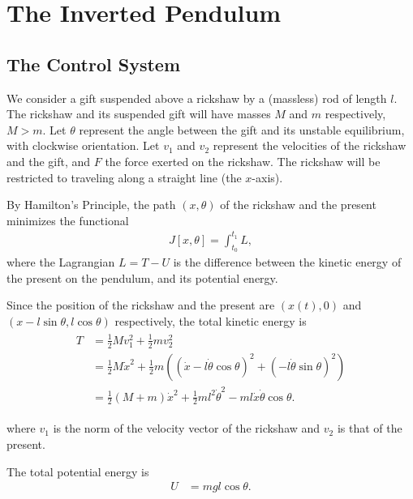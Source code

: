\section*{The Inverted Pendulum}
\subsection*{The Control System}
We consider a gift suspended above a rickshaw by a (massless) rod of length $l$.
The rickshaw and its suspended gift will have masses $M$ and $m$ respectively, $M > m$.
Let $\theta $ represent the angle between the gift and its unstable equilibrium, with clockwise orientation.
Let $v_1$ and $v_2$ represent the velocities of the rickshaw and the gift, and $F$ the force exerted on the rickshaw.
The rickshaw will be restricted to traveling along a straight line (the $x$-axis).

By Hamilton's Principle, the path $(x,\theta)$ of the rickshaw and the present minimizes the functional
\begin{align}
J[x,\theta] = \int_{t_0}^{t_1}	L,
\end{align}
where the Lagrangian $L = T - U$ is the difference between the kinetic energy of the present on the pendulum, and its potential energy.

Since the position of the rickshaw and the present are $(x(t),0)$ and $(x-l\sin \theta, l\cos \theta)$ respectively, the total kinetic energy is
\begin{align}
	\begin{split}
	T &= \frac{1}{2}Mv_1^2 +  \frac{1}{2}mv_2^2\\
	&= \frac{1}{2}M\dot{x}^2 +  \frac{1}{2}m\left((\dot{x} - l\dot{\theta}\cos \theta)^2 + (- l\dot{\theta}\sin \theta)^2\right)\\
	&= \frac{1}{2}(M+m)\dot{x}^2 +\frac{1}{2}m l^2\dot{\theta}^2-ml\dot{x}\dot{\theta}\cos \theta.
	\end{split}
\end{align}

\noindent where $v_1$ is the norm of the velocity vector of the rickshaw and $v_2$ is that of the present.

The total potential energy is
\begin{align*}
U &= mgl\cos \theta.
\end{align*}

